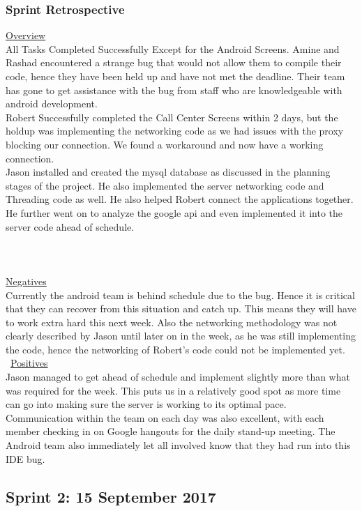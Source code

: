 \documentclass[a4paper,12pt]{article}
\begin{document}
\subsubsection{Sprint Retrospective}
\underline{Overview}\\
All Tasks Completed Successfully Except for the Android Screens. Amine and Rashad encountered a strange bug that would not allow them to compile their code, hence they have been held up and have not met the deadline. Their team has gone to get assistance with the bug from staff who are knowledgeable with android development. \\ Robert Successfully completed the Call Center Screens within 2 days, but the holdup was implementing the networking code as we had issues with the proxy blocking our connection. We found a workaround and now have a working connection. \\ Jason installed and created the mysql database as discussed in the planning stages of the project. He also implemented the server networking code and Threading code as well. He also helped Robert connect the applications together. He further went on to analyze the google api and even implemented it into the server code ahead of schedule.\\\\\\\\
\underline{Negatives}\\
Currently the android team is behind schedule due to the bug. Hence it is critical that they can recover from this situation and catch up. This means they will have to work extra hard this next week. Also the networking methodology was not clearly described by Jason until later on in the week, as he was still implementing the code, hence the networking of Robert's code could not be implemented yet. \\\
\underline{Positives}\\
Jason managed to get ahead of schedule and implement slightly more than what was required for the week. This puts us in a relatively good spot as more time can go into making sure the server is working to its optimal pace. Communication within the team on each day was also excellent, with each member checking in on Google hangouts for the daily stand-up meeting. The Android team also immediately let all involved know that they had run into this IDE bug. 

\newpage

\subsection{Sprint 2: 15 September 2017}
\end{document}
